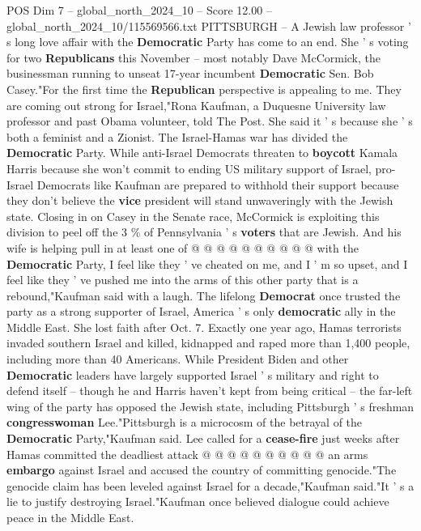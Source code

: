 \begin{textsample}{POS Dim 7 – global\_north\_2024\_10 – Score 12.00 – global\_north\_2024\_10/115569566.txt}  \label{ex:f7_pos_095}
PITTSBURGH -- A Jewish law professor ' s long love affair with the \textbf{Democratic} Party has come to an end.
She ' s voting for two \textbf{Republicans} this November -- most notably Dave McCormick, the businessman running to unseat 17-year incumbent \textbf{Democratic} Sen.
Bob Casey."For the first time the \textbf{Republican} perspective is appealing to me.
They are coming out strong for Israel,"Rona Kaufman, a Duquesne University law professor and past Obama volunteer, told The Post.
She said it ' s because she ' s both a feminist and a Zionist.
The Israel-Hamas war has divided the \textbf{Democratic} Party.
While anti-Israel Democrats threaten to \textbf{boycott} Kamala Harris because she won't commit to ending US military support of Israel, pro-Israel Democrats like Kaufman are prepared to withhold their support because they don't believe the \textbf{vice} president will stand unwaveringly with the Jewish state.
Closing in on Casey in the Senate race, McCormick is exploiting this division to peel off the 3 \% of Pennsylvania ' s \textbf{voters} that are Jewish.
And his wife is helping pull in at least one of @ @ @ @ @ @ @ @ @ @ with the \textbf{Democratic} Party, I feel like they ' ve cheated on me, and I ' m so upset, and I feel like they ' ve pushed me into the arms of this other party that is a rebound,"Kaufman said with a laugh.
The lifelong \textbf{Democrat} once trusted the party as a strong supporter of Israel, America ' s only \textbf{democratic} ally in the Middle East.
She lost faith after Oct. 7.
Exactly one year ago, Hamas terrorists invaded southern Israel and killed, kidnapped and raped more than 1,400 people, including more than 40 Americans.
While President Biden and other \textbf{Democratic} leaders have largely supported Israel ' s military and right to defend itself -- though he and Harris haven't kept from being critical -- the far-left wing of the party has opposed the Jewish state, including Pittsburgh ' s freshman \textbf{congresswoman} Lee."Pittsburgh is a microcosm of the betrayal of the \textbf{Democratic} Party,"Kaufman said.
Lee called for a \textbf{cease-fire} just weeks after Hamas committed the deadliest attack @ @ @ @ @ @ @ @ @ @ an arms \textbf{embargo} against Israel and accused the country of committing genocide."The genocide claim has been leveled against Israel for a decade,"Kaufman said."It ' s a lie to justify destroying Israel."Kaufman once believed dialogue could achieve peace in the Middle East.

\end{textsample}
